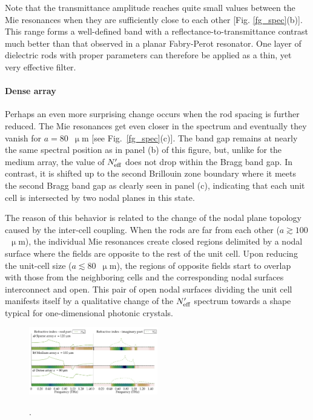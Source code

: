 Note that the transmittance amplitude reaches quite small values between the Mie resonances when they are sufficiently close to each other [Fig. \ref{fg_spec}(b)]. This range forms a well-defined band with a reflectance-to-transmittance contrast much better than that observed in a planar Fabry-Perot resonator. One layer of dielectric rods with proper parameters can therefore be applied as a thin, yet very effective filter.
\paragraph{Dense array}%
Perhaps an even more surprising change occurs when the rod spacing is further reduced. The Mie resonances get even closer in the spectrum and eventually they vanish for $a=80$~$\upmu$m [see Fig.~\ref{fg_spec}(c)]. The band gap remains at nearly the same spectral position as in panel (b) of this figure, but, unlike for the medium array, the value of $N_{\text{eff} }'$ does not drop within the Bragg band gap. In contrast, it is shifted up to the second Brillouin zone boundary where it meets the second Bragg band gap as clearly seen in panel (c), indicating that each unit cell is intersected by two nodal planes in this state.

The reason of this behavior is related to the change of the nodal plane topology caused by the inter-cell coupling. When the rods are far from each other ($a\gtrsim 100$~$\upmu$m), the individual Mie resonances create closed regions delimited by a nodal surface where the fields are opposite to the rest of the unit cell. Upon reducing the unit-cell size ($a\lesssim 80$~$\upmu$m), the regions of opposite fields start to overlap with those from the neighboring cells and the corresponding nodal surfaces interconnect and open. This pair of open nodal surfaces dividing the unit cell manifests itself by a qualitative change of the $N_{\text{eff} }'$ spectrum towards a shape typical for one-dimensional photonic crystals.

\begin{figure}\centering 
\includegraphics[width=0.5\textwidth]{img/ERods_sketch_of_separate_spectra_to_continuous_scan.pdf}
\caption{} \label{fg_spacingscan100formation}. 
\end{figure}



